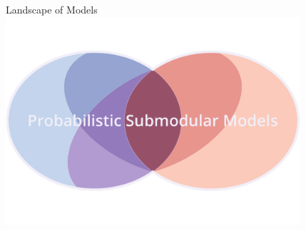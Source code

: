 \documentclass[mathserif]{beamer}
\begin{document}
\begin{frame}{Landscape of Models}
\centering
\includegraphics[width=4.3in]{figures/venn08.pdf}
\end{frame}
\end{document}

